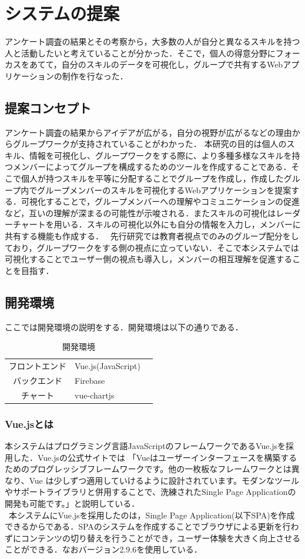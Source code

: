 \documentclass{funthesis}
\begin{document}
\chapter{システムの提案}
アンケート調査の結果とその考察から，大多数の人が自分と異なるスキルを持つ人と活動したいと考えていることが分かった．そこで，個人の得意分野にフォーカスをあてて，自分のスキルのデータを可視化し，グループで共有するWebアプリケーションの制作を行なった．

\section{提案コンセプト}
アンケート調査の結果からアイデアが広がる，自分の視野が広がるなどの理由からグループワークが支持されていることがわかった．
本研究の目的は個人のスキル、情報を可視化し、グループワークをする際に、より多種多様なスキルを持つメンバーによってグループを構成するためのツールを作成することである．そこで個人が持つスキルを平等に分配することでグループを作成し，作成したグループ内でグループメンバーのスキルを可視化するWebアプリケーションを提案する．可視化することで，グループメンバーへの理解やコミュニケーションの促進など，互いの理解が深まるの可能性が示唆される．またスキルの可視化はレーダーチャートを用いる．スキルの可視化以外にも自分の情報を入力し，メンバーに共有する機能も作成する．
\ 先行研究では教育者視点でのみのグループ配分をしており，グループワークをする側の視点に立っていない．そこで本システムでは可視化することでユーザー側の視点も導入し，メンバーの相互理解を促進することを目指す．
\section{開発環境}
ここでは開発環境の説明をする．開発環境は以下の通りである．
\begin{table}[h]
\begin{center}

  \caption{開発環境}
  \begin{tabular}{cll} \hline
    フロントエンド & Vue.js(JavaScript)  \tabularnewline
    バックエンド& Firebase\tabularnewline
    チャート &vue-chartjs \tabularnewline
    \hline
  \end{tabular}
  \label{開発環境}
  \end{center}
\end{table}

\subsection{Vue.jsとは}
本システムはプログラミング言語JavaScriptのフレームワークであるVue.jsを採用した．Vue.jsの公式サイトでは
「Vueはユーザーインターフェースを構築するためのプログレッシブフレームワークです。他の一枚板なフレームワークとは異なり、Vue は少しずつ適用していけるように設計されています。モダンなツールやサポートライブラリと併用することで、洗練されたSingle Page Applicationの開発も可能です。」\cite{A16}と説明している．\\
\ 本システムにVue.jsを採用したのは，Single Page Application(以下SPA)を作成できるからである．SPAのシステムを作成することでブラウザによる更新を行わずにコンテンツの切り替えを行うことができ，ユーザー体験を大きく向上させることができる．なおバージョン2.9.6を使用している．
\end{document}

